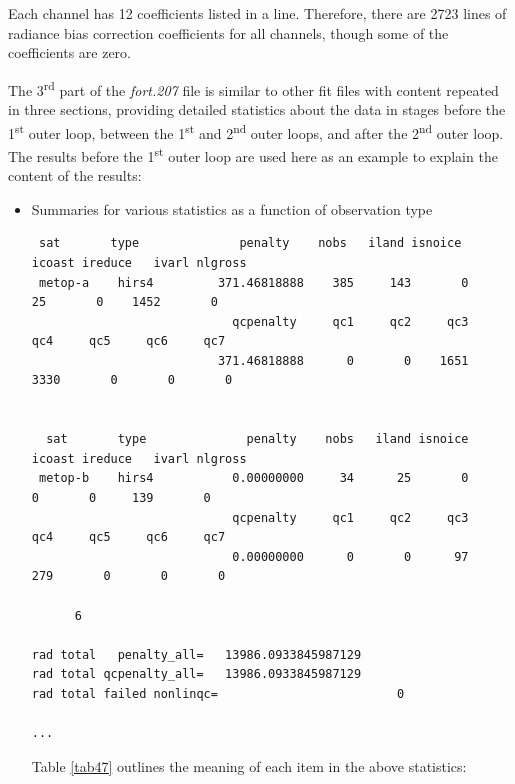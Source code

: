 Each channel has 12 coefficients listed in a line. Therefore, there are 2723 lines of radiance bias correction coefficients for all channels, though some of the coefficients are zero.

The 3\textsuperscript{rd} part of the \textit{fort.207} file is similar to other fit files with content repeated in three sections, providing detailed statistics about the data in stages before the 1\textsuperscript{st} outer loop, between the 1\textsuperscript{st} and 2\textsuperscript{nd} outer loops, and after the 2\textsuperscript{nd} outer loop. The results before the 1\textsuperscript{st} outer loop are used here as an example to explain the content of the results:

\begin{itemize}[leftmargin=*]

\item Summaries for various statistics as a function of observation type
  
\begin{scriptsize}
\begin{verbatim} 
 sat       type              penalty    nobs   iland isnoice  icoast ireduce   ivarl nlgross
 metop-a    hirs4         371.46818888    385     143       0      25       0    1452       0
                            qcpenalty     qc1     qc2     qc3     qc4     qc5     qc6     qc7
                          371.46818888      0       0    1651    3330       0       0       0


  sat       type              penalty    nobs   iland isnoice  icoast ireduce   ivarl nlgross
 metop-b    hirs4           0.00000000     34      25       0       0       0     139       0
                            qcpenalty     qc1     qc2     qc3     qc4     qc5     qc6     qc7
                            0.00000000      0       0      97     279       0       0       0

      6

rad total   penalty_all=   13986.0933845987129
rad total qcpenalty_all=   13986.0933845987129
rad total failed nonlinqc=                         0

...
\end{verbatim}
\end{scriptsize}

Table \ref{tab47} outlines the meaning of each item in the above statistics:


\end{itemize}
